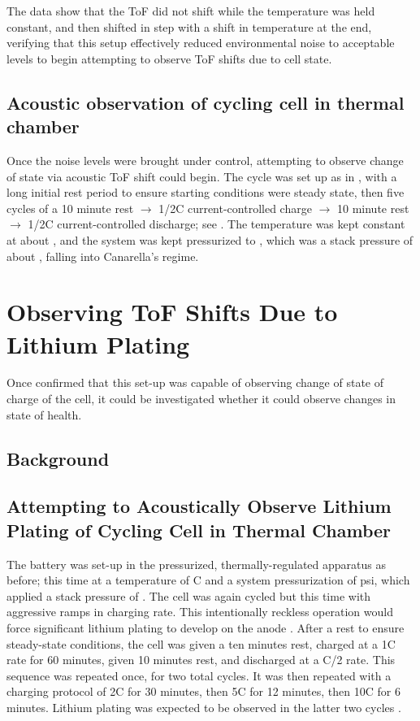 The data show that the ToF did not shift while the temperature was held constant, and then shifted in step with a shift in temperature at the end, verifying that this setup effectively reduced environmental noise to acceptable levels to begin attempting to observe ToF shifts due to cell state.

    
\subsection{Acoustic observation of cycling cell in thermal chamber}
Once the noise levels were brought under control, attempting to observe change of state via acoustic ToF shift could begin. The cycle was set up as in , with a long initial rest period to ensure starting conditions were steady state, then five cycles of a 10 minute rest $\rightarrow$ 1/2C current-controlled charge $\rightarrow$ 10 minute rest $\rightarrow$ 1/2C current-controlled discharge; see . 
The temperature was kept constant at about , and the system was kept pressurized to , which was a stack pressure of about , falling into Canarella's  regime.

\section{Observing ToF Shifts Due to Lithium Plating} 
Once confirmed that this set-up was capable of observing change of state of charge of the cell, it could be investigated whether it could observe changes in state of health.

\subsection{Background}

\subsection{Attempting to Acoustically Observe Lithium Plating of Cycling Cell in Thermal Chamber}
The battery was set-up in the pressurized, thermally-regulated apparatus as before; this time at a temperature of  C and a system pressurization of  psi, which applied a stack pressure of . 
The cell was again cycled but this time with aggressive ramps in charging rate. 
This intentionally reckless operation would force significant lithium plating to develop on the anode . 
After a rest to ensure steady-state conditions, the cell was given a ten minutes rest, charged at a 1C rate for 60 minutes, given 10 minutes rest, and discharged at a C/2 rate. 
This sequence was repeated once, for two total cycles. 
It was then repeated with a charging protocol of 2C for 30 minutes, then 5C for 12 minutes, then 10C for 6 minutes. 
Lithium plating was expected to be observed in the latter two cycles .
    

